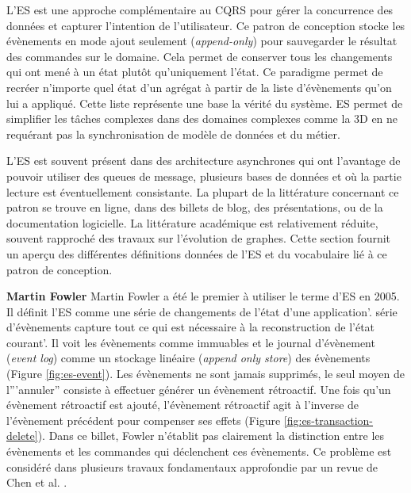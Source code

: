 L'\gls{ES} est une approche complémentaire au \gls{CQRS} pour 
gérer la 
concurrence des données et capturer l'intention de l'utilisateur. Ce patron de 
conception stocke les évènements en mode ajout seulement 
(\textit{append-only}) pour sauvegarder le résultat des commandes sur le 
domaine. Cela permet de conserver tous les changements qui ont mené à un 
état plutôt qu'uniquement l'état. Ce paradigme permet de recréer n'importe quel 
état d'un agrégat à partir de la liste d'évènements qu'on lui a appliqué. Cette 
liste représente une base la vérité du système. 
\gls{ES} permet de simplifier les tâches complexes dans des 
domaines complexes comme la 3D en ne requérant pas la synchronisation de 
modèle de données et du métier. 

L'\gls{ES} est souvent présent dans des architecture asynchrones qui ont 
l'avantage de pouvoir utiliser des queues de message, plusieurs bases de 
données et où la partie lecture est éventuellement consistante.
La plupart de la littérature concernant ce patron se trouve en ligne, dans des 
billets de blog, des présentations, ou de la documentation logicielle. La 
littérature académique est relativement réduite, souvent rapproché des travaux 
sur l'évolution de graphes. Cette section fournit un aperçu des différentes 
définitions données de l'\gls{ES} et du vocabulaire lié à ce patron de conception.

\textbf{Martin Fowler} Martin Fowler a été le premier à utiliser le terme 
d'\acrlong{ES} en 2005. Il définit l'\gls{ES} comme \og une série de 
changements 
de l'état d'une application\fg{}'.  \og série d'évènements capture tout ce qui est 
nécessaire à la reconstruction de l'état courant'\fg{}. Il voit les évènements 
comme immuables et le journal d'évènement (\textit{event log}) comme un 
stockage linéaire (\textit{append only store}) des évènements (Figure 
\ref{fig:es-event}). 
Les évènements ne sont jamais supprimés, le seul moyen de l'''annuler'' consiste à 
effectuer générer un évènement rétroactif. 
Une fois qu'un évènement rétroactif est ajouté, l'évènement rétroactif agit à 
l'inverse de l'évènement précédent pour compenser ses effets (Figure 
\ref{fig:es-transaction-delete}). 
Dans ce billet, Fowler n'établit pas clairement la distinction entre les 
évènements 
et les commandes qui déclenchent ces évènements. Ce problème est 
considéré dans plusieurs travaux fondamentaux \cite{Prakash1994,Sun2002,Weiss2009a,Weiss2010} approfondie par un revue de Chen et al. \cite{Cheng2013}.


